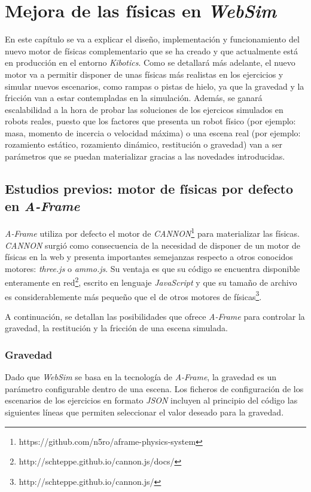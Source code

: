 \chapter{Mejora de las físicas en \textit{WebSim}}
\label{chap:motor_fisicas} 


En este capítulo se va a explicar el diseño, implementación y funcionamiento del nuevo motor de físicas complementario que se ha creado y que actualmente está en producción en el entorno \textit{Kibotics}. Como se detallará más adelante, el nuevo motor va a permitir disponer de unas físicas más realistas en los ejercicios y simular nuevos escenarios, como rampas o pistas de hielo, ya que la gravedad y la fricción van a estar contempladas en la simulación. Además, se ganará escalabilidad a la hora de probar las soluciones de los ejercicos simulados en robots reales, puesto que los factores que presenta un robot físico (por ejemplo: masa, momento de incercia o velocidad máxima) o una escena real (por ejemplo: rozamiento estático, rozamiento dinámico, restitución o gravedad) van a ser parámetros que se puedan materializar gracias a las novedades introducidas.


\section{Estudios previos: motor de físicas por defecto en \textit{A-Frame}}
\textit{A-Frame} utiliza por defecto el motor de  \textit{CANNON}\footnote{https://github.com/n5ro/aframe-physics-system} para materializar las físicas. \textit{CANNON} surgió como consecuencia de la necesidad de disponer de un motor de físicas en la web y presenta importantes semejanzas respecto a otros conocidos motores: \textit{three.js} o \textit{ammo.js}. Su ventaja es que su código se encuentra disponible enteramente en red\footnote{http://schteppe.github.io/cannon.js/docs/}, escrito en lenguaje \textit{JavaScript} y que su tamaño de archivo es considerablemente más pequeño que el de otros motores de físicas\footnote{http://schteppe.github.io/cannon.js/}.\newline

A continuación, se detallan las posibilidades que ofrece \textit{A-Frame} para controlar la gravedad, la restitución y la fricción de una escena simulada.

\subsection{Gravedad} 
Dado que \textit{WebSim} se basa en la tecnología de \textit{A-Frame}, la gravedad es un parámetro configurable dentro de una escena. Los ficheros de configuración de los escenarios de los ejercicios en formato \textit{JSON} incluyen al principio del código las siguientes líneas que permiten seleccionar el valor deseado para la gravedad.

